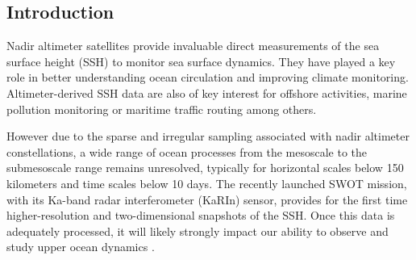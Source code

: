 \begin{bibunit}
\section{Introduction}

Nadir altimeter satellites provide invaluable direct measurements of the sea surface height (SSH) to monitor sea surface dynamics. 
They have played a key role in better understanding ocean circulation and improving climate monitoring. Altimeter-derived SSH data are also of key interest for offshore activities, marine pollution monitoring or maritime traffic routing among others. 

However due to the sparse and irregular sampling associated with nadir altimeter constellations, a wide range of ocean processes from the mesoscale to the submesoscale range remains unresolved, typically for horizontal scales below 150 kilometers and time scales below 10 days. 
The recently launched SWOT mission, with its Ka-band radar interferometer (KaRIn) sensor, provides for the first time higher-resolution and two-dimensional snapshots of the SSH. Once this data is adequately processed, it will likely strongly impact our ability to observe and study upper ocean dynamics \cite{Peral_Esteban-Fernandez_2018}. 


\end{bibunit}
